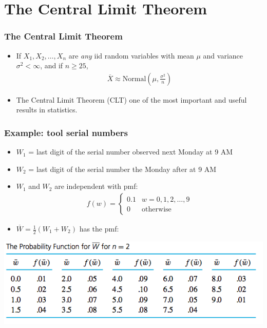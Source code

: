 \documentclass[handout]{beamer}\usepackage{graphicx, color}
\providecommand{\ov}[1]{\overline{#1}}
\numberwithin{equation}{section}
\begin{document}
\section{The Central Limit Theorem}


\begin{frame}
\frametitle{The Central Limit Theorem}
\begin{itemize}
\pause \item If $X_1, X_2, \ldots, X_n$ are \emph{any} iid random variables with mean $\mu$ and variance $\sigma^2 < \infty$, and if $n \ge 25$, 
\pause \begin{align*}
\ov{X} \approx \text{Normal} \left (\mu, \frac{\sigma^2}{n} \right)
\end{align*}
\pause \item The Central Limit Theorem (CLT) one of the most important and useful results in statistics.
\end{itemize}
\end{frame}


\begin{frame}
\frametitle{Example: tool serial numbers}
\begin{itemize}
\pause \item $W_1$ = last digit of the serial number observed next Monday at 9 AM
\pause \item $W_2$ = last digit of the serial number the Monday after at 9 AM
\pause \item $W_1 $ and $ W_2$ are independent with pmf:
\pause \begin{align*}
f(w) = \begin{cases}
0.1 & w = 0, 1, 2, \ldots, 9 \\
0 & \text{otherwise} 
\end{cases}
\end{align*}
\pause \item $\ov{W} = \frac{1}{2}(W_1 + W_2)$ has the pmf:
\end{itemize}
 \includegraphics{../../fig/wpmf.png}
\end{frame}
\end{document}
